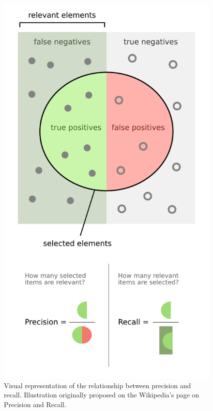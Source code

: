 \begin{figure}[hp]
    \centering
    \includegraphics[height=0.5\textheight]{figures/chap-4/precision-recall.pdf}
    \caption{Visual representation of the relationship between precision and recall. Illustration originally proposed on the Wikipedia's page on Precision and Recall.}
    \label{processing:precision-recall}
\end{figure}

